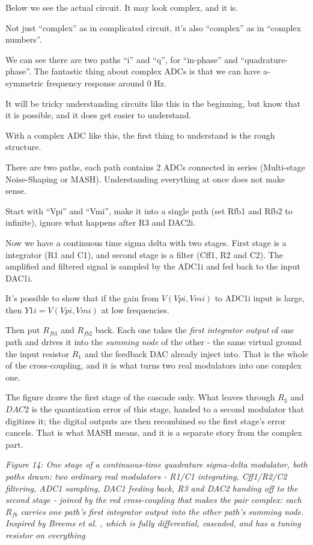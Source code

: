 Below we see the actual circuit. It may look complex, and it is.

Not just ``complex'' as in complicated circuit, it's also ``complex'' as
in ``complex numbers''.

We can see there are two paths ``i'' and ``q'', for ``in-phase'' and
``quadrature-phase''. The fantastic thing about complex ADCs is that we
can have a-symmetric frequency response around 0 Hz.

It will be tricky understanding circuits like this in the beginning, but
know that it is possible, and it does get easier to understand.

With a complex ADC like this, the first thing to understand is the rough
structure.

There are two paths, each path contains 2 ADCs connected in series
(Multi-stage Noise-Shaping or MASH). Understanding everything at once
does not make sense.

Start with ``Vpi'' and ``Vmi'', make it into a single path (set Rfb1 and
Rfb2 to infinite), ignore what happens after R3 and DAC2i.

Now we have a continuous time sigma delta with two stages. First stage
is a integrator (R1 and C1), and second stage is a filter (Cff1, R2 and
C2). The amplified and filtered signal is sampled by the ADC1i and fed
back to the input DAC1i.

It's possible to show that if the gain from \(V(Vpi,Vmi)\) to ADC1i
input is large, then \(Y1i = V(Vpi,Vmi)\) at low frequencies.

Then put \(R_{fb1}\) and \(R_{fb2}\) back. Each one takes the
\emph{first integrator output} of one path and drives it into the
\emph{summing node} of the other - the same virtual ground the input
resistor \(R_1\) and the feedback DAC already inject into. That is the
whole of the cross-coupling, and it is what turns two real modulators
into one complex one.

The figure draws the first stage of the cascade only. What leaves
through \(R_3\) and \(DAC2\) is the quantization error of this stage,
handed to a second modulator that digitizes it; the digital outputs are
then recombined so the first stage's error cancels. That is what MASH
means, and it is a separate story from the complex part.


{
\centering
{}
}

\emph{Figure 14: One stage of a continuous-time quadrature sigma-delta
modulator, both paths drawn: two ordinary real modulators - R1/C1
integrating, Cff1/R2/C2 filtering, ADC1 sampling, DAC1 feeding back, R3
and DAC2 handing off to the second stage - joined by the red
cross-coupling that makes the pair complex: each \(R_{fb}\) carries one
path's first integrator output into the other path's summing node.
Inspired by Breems et al. , which is
fully differential, cascaded, and has a tuning resistor on everything}

